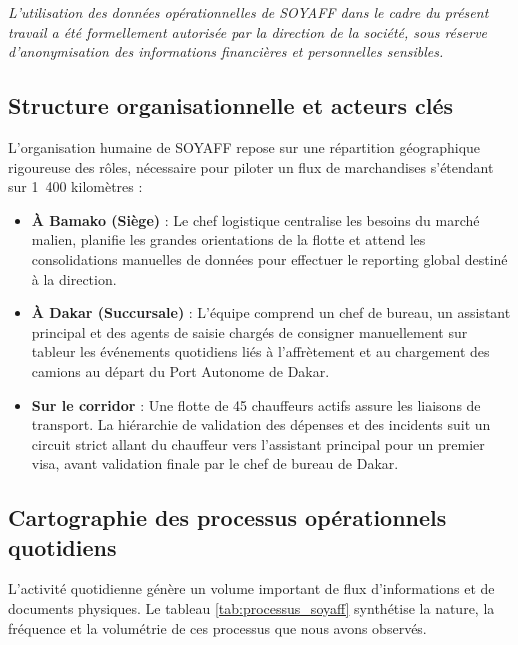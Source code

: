 \begin{small}
\textit{L'utilisation des données opérationnelles de SOYAFF dans le cadre du présent travail a été formellement autorisée par la direction de la société, sous réserve d'anonymisation des informations financières et personnelles sensibles.}
\end{small}

\subsection{Structure organisationnelle et acteurs clés}
L'organisation humaine de SOYAFF repose sur une répartition géographique rigoureuse des rôles, nécessaire pour piloter un flux de marchandises s'étendant sur 1~400 kilomètres :
\begin{itemize}
    \item \textbf{À Bamako (Siège)} : Le chef logistique centralise les besoins du marché malien, planifie les grandes orientations de la flotte et attend les consolidations manuelles de données pour effectuer le reporting global destiné à la direction.
    \item \textbf{À Dakar (Succursale)} : L'équipe comprend un chef de bureau, un assistant principal et des agents de saisie chargés de consigner manuellement sur tableur les événements quotidiens liés à l'affrètement et au chargement des camions au départ du Port Autonome de Dakar.
    \item \textbf{Sur le corridor} : Une flotte de 45 chauffeurs actifs assure les liaisons de transport. La hiérarchie de validation des dépenses et des incidents suit un circuit strict allant du chauffeur vers l'assistant principal pour un premier visa, avant validation finale par le chef de bureau de Dakar.
\end{itemize}

\subsection{Cartographie des processus opérationnels quotidiens}
L'activité quotidienne génère un volume important de flux d'informations et de documents physiques. Le tableau \ref{tab:processus_soyaff} synthétise la nature, la fréquence et la volumétrie de ces processus que nous avons observés.

